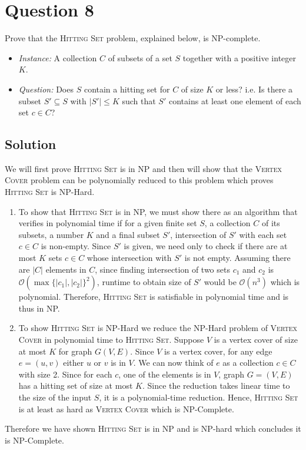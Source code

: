 
\section*{Question 8}

Prove that the \textsc{Hitting Set} problem, explained below, is NP-complete.
\begin{itemize}\itemsep=0pt
\item[] \textit{Instance:} A collection $C$ of subsets of a set $S$ together with a positive integer $K$.
\item[] \textit{Question:} Does $S$ contain a hitting set for $C$ of size $K$ or less? i.e.
Is there a subset $S' \subseteq S$ with $|S'| \leq K$ such that $S'$ contains at least one element of each set $c \in C$?
\end{itemize}

\subsection*{Solution}

We will first prove \textsc{Hitting Set} is in NP and then will show that the \textsc{Vertex Cover} problem can be polynomially reduced to this problem which proves \textsc{Hitting Set} is NP-Hard.
\begin{enumerate}[label=(\alph*)]
\item To show that \textsc{Hitting Set} is in NP, we must show there as an algorithm that verifies in polynomial time if for a given finite set $S$, a collection $C$ of its subsets, a number $K$ and a final subset $S'$, intersection of $S'$ with each set $c \in C$ is non-empty.
Since $S'$ is given, we need only to check if there are at most $K$ sets $c \in C$ whose intersection with $S'$ is not empty.
Assuming there are $|C|$ elements in $C$, since finding intersection of two sets $c_1$ and $c_2$ is $\mathcal{O}(\max\{|c_1|, |c_2|\}^2)$, runtime to obtain size of $S'$ would be $\mathcal{O}(n^3)$ which is polynomial.
Therefore, \textsc{Hitting Set} is satisfiable in polynomial time and is thus in NP.
\item To show \textsc{Hitting Set} is NP-Hard we reduce the NP-Hard problem of \textsc{Vertex Cover} in polynomial time to \textsc{Hitting Set}.
Suppose $V$ is a vertex cover of size at most $K$ for graph $G(V, E)$.
Since $V$ is a vertex cover, for any edge $e = (u,v)$ either $u$ or $v$ is in $V$.
We can now think of $e$ as a collection $c \in C$ with size 2.
Since for each $c$, one of the elements is in $V$, graph $G=(V,E)$ has a hitting set of size at most $K$.
Since the reduction takes linear time to the size of the input $S$, it is a polynomial-time reduction.
Hence, \textsc{Hitting Set} is at least as hard as \textsc{Vertex Cover} which is NP-Complete.
\end{enumerate}
Therefore we have shown \textsc{Hitting Set} is in NP and is NP-hard which concludes it is NP-Complete.
